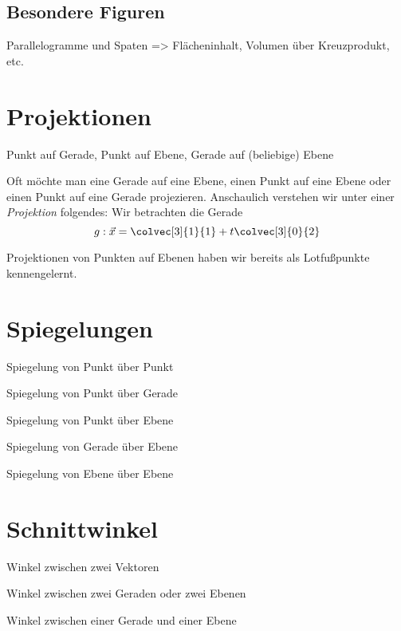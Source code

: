 \subsection{Besondere Figuren}
Parallelogramme und Spaten => Flächeninhalt, Volumen über Kreuzprodukt, etc. 

\section{Projektionen}
Punkt auf Gerade, Punkt auf Ebene, Gerade auf (beliebige) Ebene

Oft möchte man eine Gerade auf eine Ebene, einen Punkt auf eine Ebene oder einen Punkt auf eine Gerade projezieren. Anschaulich verstehen wir unter einer \textit{Projektion} folgendes: Wir betrachten die Gerade 
\begin{equation*}
    g: \vec x = \colvec[3]{1}{1} + t\colvec[3]{0}{2}
\end{equation*}

Projektionen von Punkten auf Ebenen haben wir bereits als Lotfußpunkte kennengelernt. 

\section{Spiegelungen}
Spiegelung von Punkt über Punkt 

Spiegelung von Punkt über Gerade

Spiegelung von Punkt über Ebene

Spiegelung von Gerade über Ebene

Spiegelung von Ebene über Ebene

\section{Schnittwinkel}
Winkel zwischen zwei Vektoren

Winkel zwischen zwei Geraden oder zwei Ebenen

Winkel zwischen einer Gerade und einer Ebene
